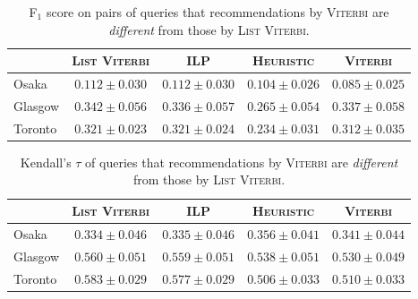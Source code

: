 \begin{table*}[!t]
	\label{tab:pf1-diff}
	\caption{F$_1$ score on pairs of queries that recommendations by \textsc{Viterbi} are \emph{different} from those by \textsc{List Viterbi}.}
	\centering
	\begin{tabular}{l|ccc|c}
		\hline
		 & \textsc{List Viterbi} & \textsc{ILP} & \textsc{Heuristic} & \textsc{Viterbi} \\ \hline
		Osaka & $0.112\pm0.030$ & $0.112\pm0.030$ & $0.104\pm0.026$ & $0.085\pm0.025$ \\
		Glasgow & $0.342\pm0.056$ & $0.336\pm0.057$ & $0.265\pm0.054$ & $0.337\pm0.058$ \\
		Toronto & $0.321\pm0.023$ & $0.321\pm0.024$ & $0.234\pm0.031$ & $0.312\pm0.035$ \\
		\hline
	\end{tabular}
\end{table*}

\begin{table*}[!t]
\label{tab:tau-diff}
\caption{Kendall's $\tau$ of queries that recommendations by \textsc{Viterbi} are \emph{different} from those by \textsc{List Viterbi}.}
\centering
\begin{tabular}{l|ccc|c}
	\hline
	 & \textsc{List Viterbi} & \textsc{ILP} & \textsc{Heuristic} & \textsc{Viterbi} \\ \hline
	Osaka & $0.334\pm0.046$ & $0.335\pm0.046$ & $0.356\pm0.041$ & $0.341\pm0.044$ \\
	Glasgow & $0.560\pm0.051$ & $0.559\pm0.051$ & $0.538\pm0.051$ & $0.530\pm0.049$ \\
	Toronto & $0.583\pm0.029$ & $0.577\pm0.029$ & $0.506\pm0.033$ & $0.510\pm0.033$ \\
	\hline
\end{tabular}
\end{table*}
